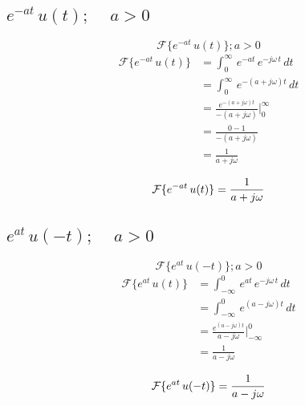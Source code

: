 \subsection{$e^{-at}\,u(t);\quad\,a>0$}
\begin{equation*}
    \mathcal{F}\{e^{-at}\,u(t)\};a>0
\end{equation*}
\begin{equation*}
\begin{split}
    \mathcal{F}\{e^{-at}\,u(t)\}
        &=\int_0^\infty\,e^{-at}\,e^{-j\omega\,t}\,dt\\
        &=\int_0^\infty\,e^{-(a+j\omega)t}\,dt\\
        &=\frac{e^{-(a+j\omega)t}}{-(a+j\omega)}\Biggr|_0^\infty\\
        &=\frac{0-1}{-(a+j\omega)}\\
        &=\frac{1}{a+j\omega}\\
\end{split}
\end{equation*}
\begin{equation}
    \mathcal{F}\{e^{-at}\,u(t)\}=\frac{1}{a+j\omega}\\
\end{equation}

\subsection{$e^{at}\,u(-t);\quad\,a>0$}
\begin{equation*}
    \mathcal{F}\{e^{at}\,u(-t)\};a>0
\end{equation*}
\begin{equation*}
\begin{split}
    \mathcal{F}\{e^{at}\,u(t)\}
        &=\int_{-\infty}^0\,e^{at}\,e^{-j\omega\,t}\,dt\\
        &=\int_{-\infty}^0\,e^{(a-j\omega)t}\,dt\\
        &=\frac{e^{(a-j\omega)t}}{a-j\omega}\Biggr|_{-\infty}^0\\
        &=\frac{1}{a-j\omega}\\
\end{split}
\end{equation*}
\begin{equation}
    \mathcal{F}\{e^{at}\,u(-t)\}=\frac{1}{a-j\omega}\\
\end{equation}

